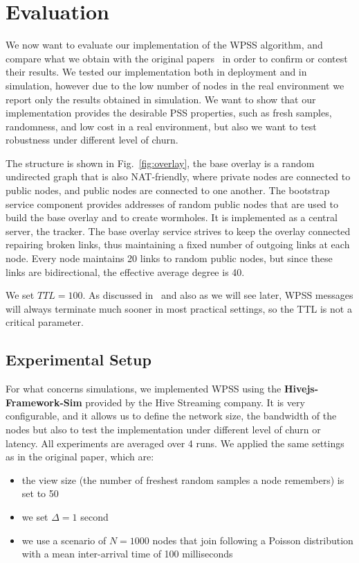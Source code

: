 
\chapter{Evaluation}
\label{cha:evaluation}
We now want to evaluate our implementation of the WPSS algorithm, and compare what we obtain with the original papers~\cite{wormhole} in order to confirm or contest their results. We tested our implementation both in deployment and in simulation, however due to the low number of nodes in the real environment we report only the results obtained in simulation. We want to show that our implementation provides the desirable PSS properties, such as fresh samples, randomness, and low cost in a real environment, but also we want to test robustness under different level of churn.

The structure is shown in Fig.~\ref{fig:overlay}, the base overlay is a random undirected graph that is also NAT-friendly, where private nodes are connected to public nodes, and public nodes are connected to one another. The bootstrap service component provides addresses of random public nodes that are used to build the base overlay and to create wormholes. It is implemented as a central server, the tracker. The base overlay service strives to keep the overlay connected repairing broken links, thus maintaining a fixed number of outgoing links at each node. Every node maintains 20 links to random public nodes, but since these links are bidirectional, the effective average degree is 40. 

We set $TTL = 100$. As discussed in~\cite{wormhole} and also as we will see later, WPSS messages will always terminate much sooner in most practical settings, so the TTL is not a critical parameter.

\section{Experimental Setup}
\label{sec:exp_setup}
For what concerns simulations, we implemented WPSS using the \textbf{Hivejs-Framework-Sim} provided by the Hive Streaming company. It is very configurable, and it allows us to define the network size, the bandwidth of the nodes but also to test the implementation under different level of churn or latency. All experiments are averaged over 4 runs. We applied the same settings as in the original paper, which are: 

\begin{itemize}
	\item the view size (the number of freshest random samples a node remembers) is set to 50
	\item we set $\Delta = 1$ second
	\item we use a scenario of $N = 1000$ nodes that join following a Poisson distribution with a mean inter-arrival time of 100 milliseconds
\end{itemize}

